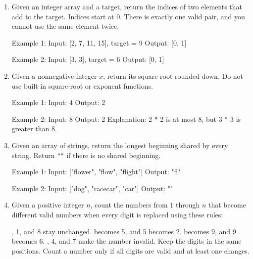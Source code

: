 \begin{enumerate}
\begin{consolethree}
Example 2:
Input: 14
Output: false
Explanation: 14 has a prime factor of 7.
\end{consolethree}
\newpage



\item
Given an integer array and a target, return the indices of two elements that add to the target. Indices start at 0. There is exactly one valid pair, and you cannot use the same element twice.

\begin{consolethree}
Example 1:
Input: [2, 7, 11, 15], target = 9
Output: [0, 1]

Example 2:
Input: [3, 3], target = 6
Output: [0, 1]
\end{consolethree}
\newpage



\item
Given a nonnegative integer $x$, return its square root rounded down. Do not use built-in square-root or exponent functions.

\begin{consolethree}
Example 1:
Input: 4
Output: 2

Example 2:
Input: 8
Output: 2
Explanation: 2 * 2 is at most 8, but 3 * 3 is greater than 8.
\end{consolethree}
\newpage



\item %
Given an array of strings, return the longest beginning shared by every string. Return \verb!""! if there is no shared beginning.

\begin{consolethree}
Example 1:
Input: ["flower", "flow", "flight"]
Output: "fl"

Example 2:
Input: ["dog", "racecar", "car"]
Output: ""
\end{consolethree}
\newpage



\item
Given a positive integer $n$, count the numbers from $1$ through $n$
that become different valid numbers when every digit is replaced using these rules:
\begin{enumerate}
, 1, and 8 stay unchanged.
 becomes 5, and 5 becomes 2.
 becomes 9, and 9 becomes 6.
, 4, and 7 make the number invalid.
\li Keep the digits in the same positions. Count a number only if all digits are valid and at least one changes.
\end{enumerate}


\end{enumerate}
